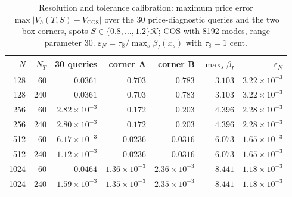 \begin{table}[!htbp]
\centering\small
\caption{Resolution and tolerance calibration: maximum price error $\max|V_h(T,S)-V_{\mathrm{COS}}|$ over the 30 price-diagnostic queries and the two box corners, spots $S\in\{0.8,\dots,1.2\}\mathcal K$; COS with 8192 modes, range parameter 30. $\varepsilon_N=\tau_\$/\max_s\beta_I(x_s)$ with $\tau_\$=1$ cent.}
\label{tab:budget}
\begin{tabular}{rrrrrrr}
\toprule
$N$ & $N_T$ & 30 queries & corner A & corner B & $\max_s\beta_I$ & $\varepsilon_N$\\
\midrule
128 & 60 & $0.0361$ & $0.703$ & $0.783$ & $3.103$ & $3.22\times10^{-3}$\\
128 & 240 & $0.0361$ & $0.703$ & $0.783$ & $3.103$ & $3.22\times10^{-3}$\\
256 & 60 & $2.82\times10^{-3}$ & $0.172$ & $0.203$ & $4.396$ & $2.28\times10^{-3}$\\
256 & 240 & $2.80\times10^{-3}$ & $0.172$ & $0.203$ & $4.396$ & $2.28\times10^{-3}$\\
512 & 60 & $6.17\times10^{-3}$ & $0.0236$ & $0.0316$ & $6.073$ & $1.65\times10^{-3}$\\
512 & 240 & $1.12\times10^{-3}$ & $0.0236$ & $0.0316$ & $6.073$ & $1.65\times10^{-3}$\\
1024 & 60 & $0.0464$ & $1.36\times10^{-3}$ & $2.36\times10^{-3}$ & $8.441$ & $1.18\times10^{-3}$\\
1024 & 240 & $1.59\times10^{-3}$ & $1.35\times10^{-3}$ & $2.35\times10^{-3}$ & $8.441$ & $1.18\times10^{-3}$\\
\bottomrule
\end{tabular}
\end{table}
